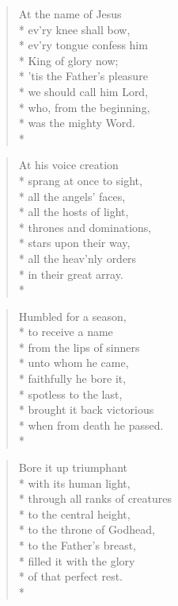 \documentclass[12pt]{article}
\newcounter{count}
\newcommand\printcount{\addtocounter{count}{1}\thecount}
\begin{document}
\begin{multicols}{2}
\setcounter{count}{0}
\setcounter{count}{0}
\begin{verse}
\flagverse{\printcount.} At the name of Jesus\\*
ev'ry knee shall bow,\\*
ev'ry tongue confess him\\*
King of glory now;\\*
'tis the Father's pleasure\\*
we should call him Lord,\\*
who, from the beginning,\\*
was the mighty Word.\\*
\end{verse}

\begin{verse}
\flagverse{\printcount.} At his voice creation\\*
sprang at once to sight,\\*
all the angels' faces,\\*
all the hosts of light,\\*
thrones and dominations,\\*
stars upon their way,\\*
all the heav'nly orders\\*
in their great array.\\*
\end{verse}

\begin{verse}
\flagverse{\printcount.} Humbled for a season,\\*
to receive a name\\*
from the lips of sinners\\*
unto whom he came,\\*
faithfully he bore it,\\*
spotless to the last,\\*
brought it back victorious\\*
when from death he passed.\\*
\end{verse}

\begin{verse}
\flagverse{\printcount.} Bore it up triumphant\\*
with its human light,\\*
through all ranks of creatures\\*
to the central height,\\*
to the throne of Godhead,\\*
to the Father's breast,\\*
filled it with the glory\\*
of that perfect rest.\\*
\end{verse}
\end{multicols}
\end{document}
